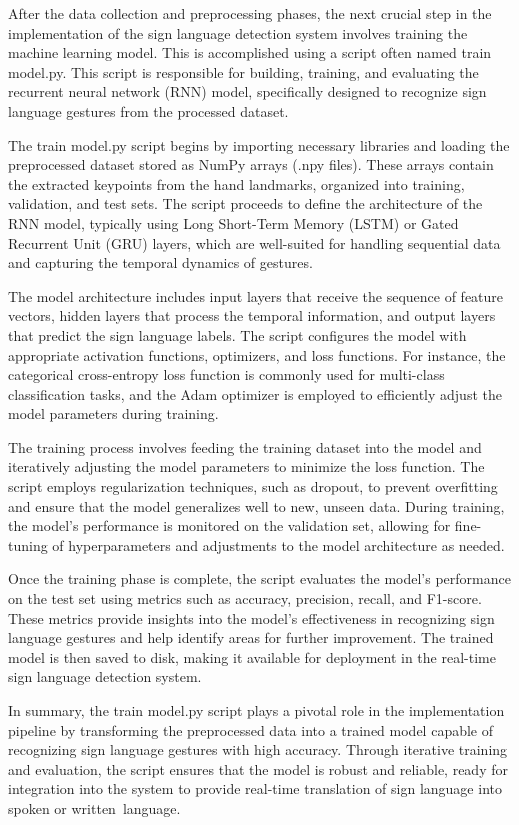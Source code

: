After the data collection and preprocessing phases, the next crucial step in the implementation of the sign language detection system involves training the machine learning model. This is accomplished using a script often named train model.py. This script is responsible for building, training, and evaluating the recurrent neural network (RNN) model, specifically designed to recognize sign language gestures from the processed dataset.

The train model.py script begins by importing necessary libraries and loading the preprocessed dataset stored as NumPy arrays (.npy files). These arrays contain the extracted keypoints from the hand landmarks, organized into training, validation, and test sets. The script proceeds to define the architecture of the RNN model, typically using Long Short-Term Memory (LSTM) or Gated Recurrent Unit (GRU) layers, which are well-suited for handling sequential data and capturing the temporal dynamics of gestures.

The model architecture includes input layers that receive the sequence of feature vectors, hidden layers that process the temporal information, and output layers that predict the sign language labels. The script configures the model with appropriate activation functions, optimizers, and loss functions. For instance, the categorical cross-entropy loss function is commonly used for multi-class classification tasks, and the Adam optimizer is employed to efficiently adjust the model parameters during training.

The training process involves feeding the training dataset into the model and iteratively adjusting the model parameters to minimize the loss function. The script employs regularization techniques, such as dropout, to prevent overfitting and ensure that the model generalizes well to new, unseen data. During training, the model's performance is monitored on the validation set, allowing for fine-tuning of hyperparameters and adjustments to the model architecture as needed.

Once the training phase is complete, the script evaluates the model's performance on the test set using metrics such as accuracy, precision, recall, and F1-score. These metrics provide insights into the model's effectiveness in recognizing sign language gestures and help identify areas for further improvement. The trained model is then saved to disk, making it available for deployment in the real-time sign language detection system.

In summary, the train model.py script plays a pivotal role in the implementation pipeline by transforming the preprocessed data into a trained model capable of recognizing sign language gestures with high accuracy. Through iterative training and evaluation, the script ensures that the model is robust and reliable, ready for integration into the system to provide real-time translation of sign language into spoken or written language.
